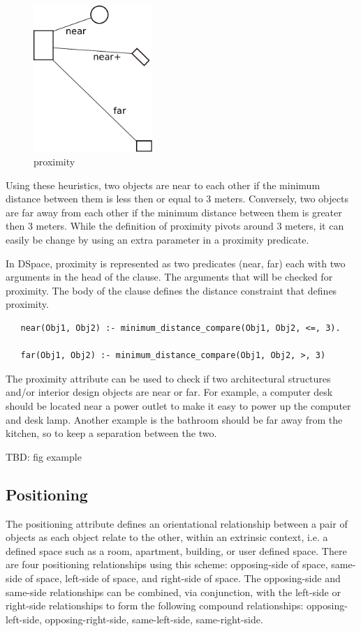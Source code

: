 \documentclass[12pt]{ucthesis}
\begin{document}
\begin{figure}[H]
\centering
\includegraphics[width=45mm]{proximity}
\caption{proximity}
\label{proximity}
\end{figure}

Using these heuristics, two objects are near to each other if the minimum distance between them is less then or equal to 3 meters. Conversely, two objects are far away from each other if the minimum distance between them is greater then 3 meters. While the definition of proximity pivots around 3 meters, it can easily be change by using an extra parameter in a proximity predicate. 

In DSpace, proximity is represented as two predicates (near, far) each with two arguments in the head of the clause. The arguments that will be checked for proximity. The body of the clause defines the distance constraint that defines proximity.

\begin{verbatim}
   near(Obj1, Obj2) :- minimum_distance_compare(Obj1, Obj2, <=, 3).
   
   far(Obj1, Obj2) :- minimum_distance_compare(Obj1, Obj2, >, 3)

\end{verbatim}

The proximity attribute can be used to check if two architectural structures and/or interior design objects are near or far. For example, a computer desk should be located near a power outlet to make it easy to power up the computer and desk lamp. Another example is the bathroom should be far away from the kitchen, so to keep a separation between the two.

TBD: fig example


\subsection{Positioning}
The positioning attribute defines an orientational relationship between a pair of objects as each object relate to the other, within an extrinsic context, i.e. a defined space such as a room, apartment, building, or user defined space. There are four positioning relationships using this scheme: opposing-side of space, same-side of space, left-side of space, and right-side of space. The opposing-side and same-side relationships can be combined, via conjunction, with the left-side or right-side relationships to form the following compound relationships: opposing-left-side, opposing-right-side, same-left-side, same-right-side.
\end{document}
